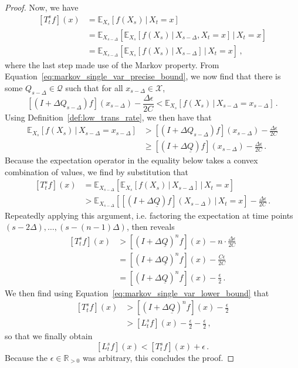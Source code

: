 \documentclass[10pt]{paper}
\newcommand{\reals}{\mathbb{R}}
\newcommand{\realspos}{\reals_{>0}}
\newcommand{\states}{\mathcal{X}}
\newcommand{\rateset}{\mathcal{Q}}
\newcommand{\lrate}{\underline{Q}}
\begin{document}
\begin{proof}
Now, we have
\begin{align*}
\left[T_t^sf\right](x) &= \mathbb{E}_{X_{s}}[f(X_{s})\,\vert\,X_t=x] \\
 &= \mathbb{E}_{X_{s-\Delta}}\left[\mathbb{E}_{X_s}[f(X_s)\,\vert\,X_{s-\Delta},X_t=x]\,\vert\,X_t=x\right] \\
 &= \mathbb{E}_{X_{s-\Delta}}\left[\mathbb{E}_{X_s}[f(X_s)\,\vert\,X_{s-\Delta}]\,\vert\,X_t=x\right]\,,
\end{align*}
where the last step made use of the Markov property. From Equation~\ref{eq:markov_single_var_precise_bound}, we now find that there is some $Q_{s-\Delta}\in\rateset$ such that for all $x_{s-\Delta}\in\states$,
\begin{equation*}
\left[(I+\Delta Q_{s-\Delta})f\right](x_{s-\Delta}) - \frac{\Delta\epsilon}{2C} < \mathbb{E}_{X_s}[f(X_s)\,\vert\,X_{s-\Delta}=x_{s-\Delta}]\,.
\end{equation*}
Using Definition~\ref{def:low_trans_rate}, we then have that
\begin{align*}
\mathbb{E}_{X_s}[f(X_s)\,\vert\,X_{s-\Delta}=x_{s-\Delta}] &> \left[(I+\Delta Q_{s-\Delta})f\right](x_{s-\Delta}) - \frac{\Delta\epsilon}{2C} \\
 &\geq \left[(I+\Delta \lrate)f\right](x_{s-\Delta}) - \frac{\Delta\epsilon}{2C}\,.
\end{align*}
Because the expectation operator in the equality below takes a convex combination of values, we find by substitution that
\begin{align*}
\left[T_t^sf\right](x) &= \mathbb{E}_{X_{s-\Delta}}\left[\mathbb{E}_{X_s}[f(X_s)\,\vert\,X_{s-\Delta}]\,\vert\,X_t=x\right] \\
 &> \mathbb{E}_{X_{s-\Delta}}\left[\left[(I+\Delta\lrate)f\right](X_{s-\Delta})\,\vert\,X_t=x\right] - \frac{\Delta\epsilon}{2C}\,.
\end{align*}
Repeatedly applying this argument, i.e. factoring the expectation at time points $(s-2\Delta),\ldots,(s-(n-1)\Delta)$, then reveals
\begin{align*}
\left[T_t^sf\right](x) &> \left[(I+\Delta\lrate)^nf\right](x) - n\cdot\frac{\Delta\epsilon}{2C} \\
 &= \left[(I+\Delta\lrate)^nf\right](x) - \frac{C\epsilon}{2C} \\
 &= \left[(I+\Delta\lrate)^nf\right](x) - \frac{\epsilon}{2}\,.
\end{align*}
We then find using Equation~\ref{eq:markov_single_var_lower_bound} that
\begin{align*}
\left[T_t^sf\right](x) &> \left[(I+\Delta\lrate)^nf\right](x) - \frac{\epsilon}{2} \\
 &> \left[L_t^sf\right](x) - \frac{\epsilon}{2} - \frac{\epsilon}{2}\,,
\end{align*}
so that we finally obtain
\begin{equation*}
\left[L_t^sf\right](x) < \left[T_t^sf\right](x) + \epsilon\,.
\end{equation*}
Because the $\epsilon\in\realspos$ was arbitrary, this concludes the proof.
\end{proof}
\end{document}
